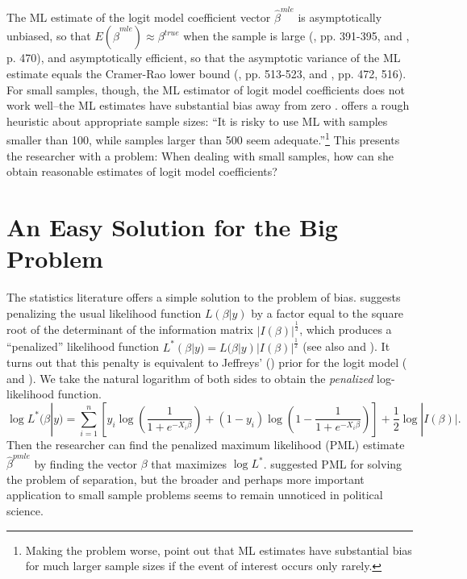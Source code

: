 \documentclass[12pt]{article}
\begin{document}
The ML estimate of the logit model coefficient vector $\hat{\beta}^{mle}$ is asymptotically unbiased, so that $E(\hat{\beta}^{mle}) \approx \beta^{true}$ when the sample is large (\citealt{Wooldridge2002}, pp. 391-395, and \citealt{CasellaBerger2002}, p. 470), and asymptotically efficient, so that the asymptotic variance of the ML estimate equals the Cramer-Rao lower bound (\citealt{Greene2012}, pp. 513-523, and \citealt{CasellaBerger2002}, pp. 472, 516). 
For small samples, though, the ML estimator of logit model coefficients does not work well--the ML estimates have substantial bias away from zero \citep[pp. 53-54]{Long1997}.
\citet[p. 54]{Long1997} offers a rough heuristic about appropriate sample sizes: ``It is risky to use ML with samples smaller than 100, while samples larger than 500 seem adequate.''\footnote{Making the problem worse, \cite{KingZeng2001} point out that ML estimates have substantial bias for much larger sample sizes if the event of interest occurs only rarely.}
This presents the researcher with a problem: When dealing with small samples, how can she obtain reasonable estimates of logit model coefficients?

\section*{An Easy Solution for the Big Problem}

The statistics literature offers a simple solution to the problem of bias.
\cite{Firth1993} suggests penalizing the usual likelihood function $L(\beta | y)$ by a factor equal to the square root of the determinant of the information matrix $|I(\beta)|^\frac{1}{2}$, which produces a ``penalized'' likelihood function $L^*(\beta | y) = L(\beta | y)|I(\beta)|^\frac{1}{2}$ (see also \citealt{KosmidisFirth2009} and \citealt{Kosmidis2014}).
It turns out that this penalty is equivalent to Jeffreys' (\citeyear{Jeffreys1946}) prior for the logit model (\citealt{Firth1993} and \citealt{Poirier1994}).
We take the natural logarithm of both sides to obtain the \textit{penalized} log-likelihood function.
\begin{equation}\nonumber
\log L^*(\beta | y) = \displaystyle \sum_{i = 1}^n \left[y_i \log \left( \dfrac{1}{1 + e^{-X_i\beta}}\right) + (1 - y_i) \log \left(1 - \dfrac{1}{1 + e^{-X_i\beta}}\right)\right] + \dfrac{1}{2} \log |I(\beta)|.
\end{equation}
Then the researcher can find the penalized maximum likelihood (PML) estimate $\hat{\beta}^{pmle}$ by finding the vector $\beta$ that maximizes $\log L^*$.
\cite{Zorn2005} suggested PML for solving the problem of separation,
but the broader and perhaps more important application to small sample problems seems to remain unnoticed in political science.
\end{document}
